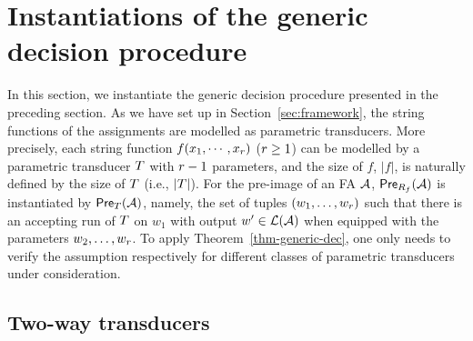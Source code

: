 
\section{Instantiations of the generic decision procedure}\label{sec-instan}

In this section, we instantiate the generic decision procedure presented in the preceding section. 
As we have set up in Section~\ref{sec:framework}, the string functions of the assignments are modelled as parametric transducers. More precisely, each string function $f(x_1, \cdots, x_r)$ ($r\geq 1$) can be modelled by a parametric transducer $T$  
with $r-1$ parameters, and the size of $f$, $|f|$, is naturally defined by the size of $T$ (i.e., $|T|$). For the pre-image of an FA $\mathcal{A}$,  $\textsf{Pre}_{R_f}(\mathcal{A})$ is instantiated by $\textsf{Pre}_{T}(\mathcal{A})$, namely, the set of tuples $(w_1,\ldots, w_r)$ such that there is an accepting run of $T$ on $w_1$ with output $w'\in \mathcal{L}(\mathcal{A})$ when equipped with the parameters $w_2,\ldots, w_r$. To apply Theorem~\ref{thm-generic-dec}, one only needs to verify the \prerec{} assumption respectively for different classes of parametric transducers under consideration. 



 
\subsection{Two-way transducers}\label{sec-2way}



